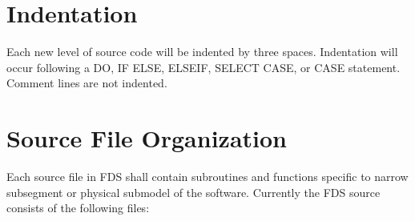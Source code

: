 \documentclass[11pt]{book}
\begin{document}
\section{Indentation}

Each new level of source code will be indented by three spaces.  Indentation will occur following a {\ct DO},
{\ct IF} {\ct ELSE}, {\ct ELSEIF}, {\ct SELECT CASE}, or {\ct CASE} statement. Comment lines are not indented.

\section{Source File Organization}

Each source file in FDS shall contain subroutines and functions specific to narrow subsegment or physical submodel of
the software.  Currently the FDS source consists of the following files:
\end{document}
